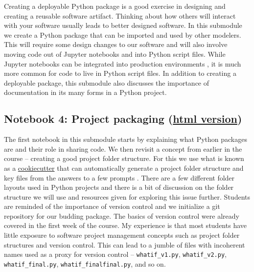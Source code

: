 \documentclass[ited]{informs3}                      %
\newcommand{\code}[1]{\texttt{#1}}
\begin{document}
Creating a deployable Python package is a good exercise in designing and creating a reusable software artifact. Thinking about how others will interact with your software usually leads to better designed software.  In this submodule we create a Python package that can be imported and used by other modelers. This will require some design changes to our software and will also involve moving code out of Jupyter notebooks and into Python script files. While Jupyter notebooks can be integrated into production environments \citep{uffordInteractiveNotebookInnovation2019}, it is much more common for code to live in Python script files. In addition to creating a deployable package, this submodule also discusses the importance of documentation in its many forms in a Python project.

\subsection{Notebook 4: Project packaging (\href{http://www.sba.oakland.edu/faculty/isken/excel_with_python/what_if_4_project_packaging.html}{html version})}

The first notebook in this submodule starts by explaining what Python packages are and their role in sharing code. We then revisit a concept from earlier in the course -- creating a good project folder structure. For this we use what is known as a \href{https://cookiecutter.readthedocs.io/en/stable/}{cookiecutter} that can automatically generate a project folder structure and key files from the answers to a few prompts \citep{audreyroyandcookiecuttercommunityCookiecutterBetterProject2012}. There are a few different folder layouts used in Python projects and there is a bit of discussion on the folder structure we will use and resources given for exploring this issue further. Students are reminded of the importance of version control and we initialize a git repository for our budding package. The basics of version control were already covered in the first week of the course. My experience is that most students have little exposure to software project management concepts such as project folder structures and version control. This can lead to a jumble of files with incoherent names used as a proxy for version control -- \code{whatif\_v1.py}, \code{whatif\_v2.py}, \code{whatif\_final.py}, \code{whatif\_finalfinal.py}, and so on.
\end{document}
